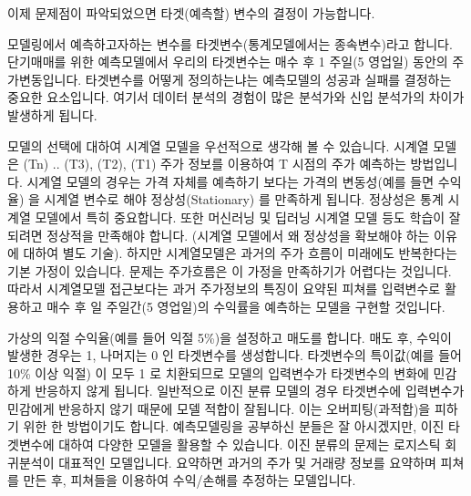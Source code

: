 \documentclass[letterpaper,10pt,english]{jupyterBook}
\begin{document}
\sphinxAtStartPar
이제 문제점이 파악되었으면 타겟(예측할) 변수의 결정이 가능합니다.

\sphinxAtStartPar
모델링에서 예측하고자하는 변수를 타겟변수(통계모델에서는 종속변수)라고 합니다. 단기매매를 위한 예측모델에서 우리의 타겟변수는 매수 후 1 주일(5 영업일) 동안의 주가변동입니다. 타겟변수를 어떻게 정의하는냐는 예측모델의 성공과 실패를 결정하는 중요한 요소입니다. 여기서 데이터 분석의 경험이 많은 분석가와 신입 분석가의 차이가 발생하게 됩니다.

\sphinxAtStartPar
모델의 선택에 대하여 시계열 모델을 우선적으로 생각해 볼 수 있습니다. 시계열 모델은 (T\sphinxhyphen{}n) .. (T\sphinxhyphen{}3), (T\sphinxhyphen{}2), (T\sphinxhyphen{}1) 주가 정보를 이용하여 T 시점의 주가 예측하는 방법입니다. 시계열 모델의 경우는 가격 자체를 예측하기 보다는 가격의 변동성(예를 들면 수익율) 을 시계열 변수로 해야 정상성(Stationary) 를 만족하게 됩니다. 정상성은 통계 시계열 모델에서 특히 중요합니다. 또한 머신러닝 및 딥러닝 시계열 모델 등도 학습이 잘 되려면 정상적을 만족해야 합니다. (시계열 모델에서 왜 정상성을 확보해야 하는 이유에 대하여 별도 기술). 하지만 시계열모델은 과거의 주가 흐름이 미래에도 반복한다는 기본 가정이 있습니다.  문제는 주가흐름은 이 가정을 만족하기가 어렵다는 것입니다.  따라서 시계열모델 접근보다는 과거 주가정보의 특징이 요약된 피쳐를 입력변수로 활용하고 매수 후 일 주일간(5 영업일)의 수익률을 예측하는 모델을 구현할 것입니다.​

\sphinxAtStartPar
가상의 익절 수익율(예를 들어 익절 5\%)을 설정하고 매도를 합니다. 매도 후, 수익이 발생한 경우는 1, 나머지는 0 인 타겟변수를 생성합니다. 타겟변수의 특이값(예를 들어 10\% 이상 익절) 이 모두 1 로 치환되므로 모델의 입력변수가 타겟변수의 변화에 민감하게 반응하지 않게 됩니다. 일반적으로 이진 분류 모델의 경우 타겟변수에 입력변수가 민감에게 반응하지 않기 때문에 모델 적합이 잘됩니다. 이는 오버피팅(과적합)을 피하기 위한 한 방법이기도 합니다. 예측모델링을 공부하신 분들은 잘 아시겠지만, 이진 타겟변수에 대하여 다양한 모델을 활용할 수 있습니다. 이진 분류의 문제는 로지스틱 회귀분석이 대표적인 모델입니다. 요약하면 과거의 주가 및 거래량 정보를 요약하며 피쳐를 만든 후, 피쳐들을 이용하여 수익/손해를 추정하는 모델입니다.


\chapter{}
\label{\detokenize{chapter4/4.2.0_My_Strategy:id1}}\label{\detokenize{chapter4/4.2.0_My_Strategy::doc}}
\end{document}
